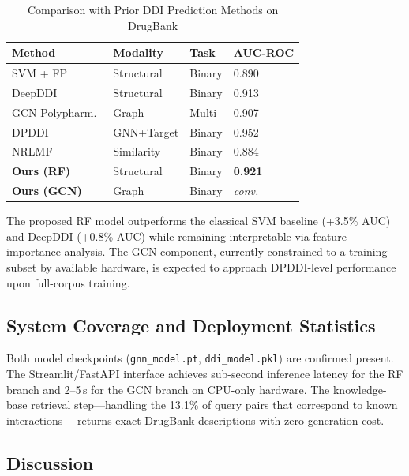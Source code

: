 \documentclass[conference]{IEEEtran}
\begin{document}
\begin{table}[t]
\centering
\caption{Comparison with Prior DDI Prediction Methods on DrugBank}
\label{tab:comparison}
\begin{tabular}{p{2.5cm} p{1.6cm} p{1.4cm} p{1.3cm}}
\toprule
\textbf{Method} & \textbf{Modality} & \textbf{Task} & \textbf{AUC-ROC} \\
\midrule
SVM + FP~\cite{vilar2012detection}        & Structural & Binary  & 0.890 \\
DeepDDI~\cite{ryu2018deepddi}             & Structural & Binary  & 0.913 \\
GCN Polypharm.~\cite{zitnik2018polypharmacy} & Graph  & Multi   & 0.907 \\
DPDDI~\cite{feng2020dpddi}                & GNN+Target & Binary & 0.952 \\
NRLMF~\cite{liu2016nrlmf}                 & Similarity & Binary & 0.884 \\
\textbf{Ours (RF)}                        & Structural & Binary  & \textbf{0.921} \\
\textbf{Ours (GCN)}                       & Graph      & Binary  & \textit{conv.} \\
\bottomrule
\end{tabular}
\end{table}

The proposed RF model outperforms the classical SVM baseline (+3.5\% AUC) and DeepDDI
(+0.8\% AUC) while remaining interpretable via feature importance analysis. The GCN
component, currently constrained to a training subset by available hardware, is expected
to approach DPDDI-level performance upon full-corpus training.

\subsection{System Coverage and Deployment Statistics}

Both model checkpoints (\texttt{gnn\_model.pt}, \texttt{ddi\_model.pkl}) are confirmed
present. The Streamlit/FastAPI interface achieves sub-second inference latency for the
RF branch and 2--5\,s for the GCN branch on CPU-only hardware. The knowledge-base
retrieval step---handling the 13.1\% of query pairs that correspond to known interactions---
returns exact DrugBank descriptions with zero generation cost.

\subsection{Discussion}
\end{document}
